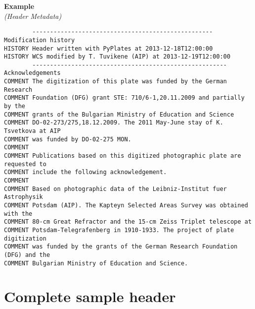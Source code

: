 \documentclass[11pt]{ivoa}
\newenvironment{fitsexample}[1]
{\bigskip\noindent\textbf{Example}\\\textit{(#1\smallskip)}}
{\medskip}
\begin{document}
\begin{fitsexample}{Header Metadata}
\begin{lstlisting}
        --------------------------------------------------- Modification history
HISTORY Header written with PyPlates at 2013-12-18T12:00:00
HISTORY WCS modified by T. Tuvikene (AIP) at 2013-12-19T12:00:00
        ------------------------------------------------------- Acknowledgements
COMMENT The digitization of this plate was funded by the German Research
COMMENT Foundation (DFG) grant STE: 710/6-1,20.11.2009 and partially by the
COMMENT grants of the Bulgarian Ministry of Education and Science
COMMENT DO-02-273/275,18.12.2009. The 2011 May-June stay of K. Tsvetkova at AIP
COMMENT was funded by DO-02-275 MON.
COMMENT
COMMENT Publications based on this digitized photographic plate are requested to
COMMENT include the following acknowledgement.
COMMENT
COMMENT Based on photographic data of the Leibniz-Institut fuer Astrophysik
COMMENT Potsdam (AIP). The Kapteyn Selected Areas Survey was obtained with the
COMMENT 80-cm Great Refractor and the 15-cm Zeiss Triplet telescope at
COMMENT Potsdam-Telegrafenberg in 1910-1933. The project of plate digitization
COMMENT was funded by the grants of the German Research Foundation (DFG) and the
COMMENT Bulgarian Ministry of Education and Science.
\end{lstlisting}
\end{fitsexample}


\section{Complete sample header}
\label{sect:samplehdr}
\end{document}
